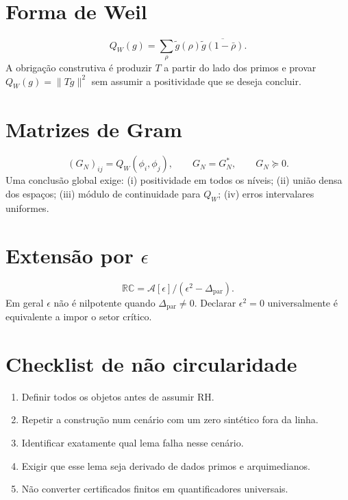 \documentclass[11pt,a4paper]{article}
\newcommand{\Dpar}{\Delta_{\mathrm{par}}}
\begin{document}
\section{Forma de Weil}
\[Q_W(g)=\sum_\rho\widetilde g(\rho)\overline{\widetilde g(1-\bar\rho)}.\]
A obrigação construtiva é produzir $T$ a partir do lado dos primos e provar $Q_W(g)=\|Tg\|^2$ sem assumir a positividade que se deseja concluir.
\section{Matrizes de Gram}
\[(G_N)_{ij}=Q_W(\phi_i,\phi_j),\qquad G_N=G_N^*,\qquad G_N\succeq0.\]
Uma conclusão global exige: (i) positividade em todos os níveis; (ii) união densa dos espaços; (iii) módulo de continuidade para $Q_W$; (iv) erros intervalares uniformes.
\section{Extensão por $\epsilon$}
\[\mathbb{RC}=\mathcal A[\epsilon]/(\epsilon^2-\Dpar).\]
Em geral $\epsilon$ não é nilpotente quando $\Dpar\ne0$. Declarar $\epsilon^2=0$ universalmente é equivalente a impor o setor crítico.
\section{Checklist de não circularidade}
\begin{enumerate}[label=\arabic*.]
\item Definir todos os objetos antes de assumir RH.
\item Repetir a construção num cenário com um zero sintético fora da linha.
\item Identificar exatamente qual lema falha nesse cenário.
\item Exigir que esse lema seja derivado de dados primos e arquimedianos.
\item Não converter certificados finitos em quantificadores universais.
\end{enumerate}
\end{document}
